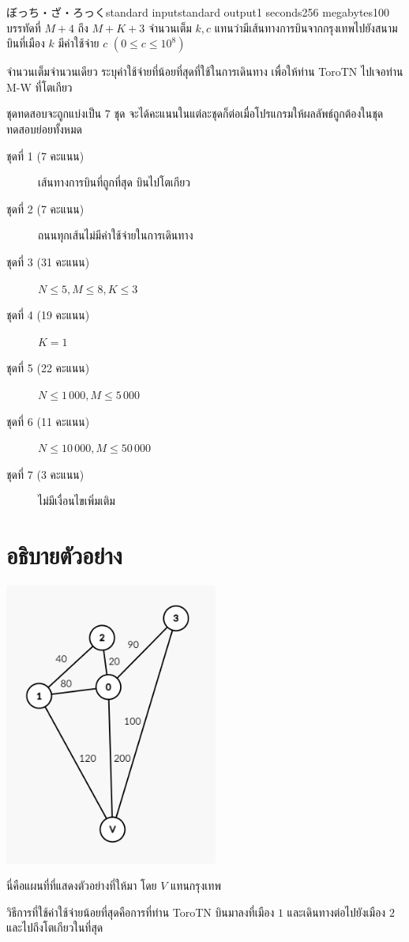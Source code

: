 \documentclass[11pt,a4paper]{article}
\begin{document}
\begin{problem}{ぼっち・ざ・ろっく}{standard input}{standard output}{1 seconds}{256 megabytes}{100}
บรรทัดที่ $M+4$ ถึง $M+K+3$ จำนวนเต็ม $k, c$ แทนว่ามีเส้นทางการบินจากกรุงเทพไปยังสนามบินที่เมือง $k$ มีค่าใช้จ่าย $c$ $(0 \leq c \leq 10^8)$

\OutputFile

จำนวนเต็มจำนวนเดียว ระบุค่าใช้จ่ายที่น้อยที่สุดที่ใช้ในการเดินทาง เพื่อให้ท่าน ToroTN ไปเจอท่าน M-W ที่โตเกียว

\Scoring
ชุดทดสอบจะถูกแบ่งเป็น 7 ชุด จะได้คะแนนในแต่ละชุดก็ต่อเมื่อโปรแกรมให้ผลลัพธ์ถูกต้องในชุดทดสอบย่อยทั้งหมด

\begin{description}

\item[ชุดที่ 1 (7 คะแนน)] เส้นทางการบินที่ถูกที่สุด บินไปโตเกียว
\item[ชุดที่ 2 (7 คะแนน)] ถนนทุกเส้นไม่มีค่าใช้จ่ายในการเดินทาง
\item[ชุดที่ 3 (31 คะแนน)] $N \leq 5, M \leq 8, K \le 3$
\item[ชุดที่ 4 (19 คะแนน)] $K = 1$
\item[ชุดที่ 5 (22 คะแนน)] $N \le 1\,000, M \leq 5\,000$
\item[ชุดที่ 6 (11 คะแนน)] $N \le 10\,000, M \leq 50\,000$
\item[ชุดที่ 7 (3 คะแนน)] ไม่มีเงื่อนไขเพิ่มเติม

\end{description}

\Examples

\begin{example}
%
\end{example}

\section*{อธิบายตัวอย่าง}

\includegraphics[width=7cm]{04-bocchitherock/bocchitherock-exgraph.png}

นี่คือแผนที่ที่แสดงตัวอย่างที่ให้มา โดย $V$ แทนกรุงเทพ

วิธีการที่ใช้ค่าใช้จ่ายน้อยที่สุดคือการที่ท่าน ToroTN บินมาลงที่เมือง $1$ และเดินทางต่อไปยังเมือง $2$ และไปถึงโตเกียวในที่สุด

\end{problem}
\end{document}

